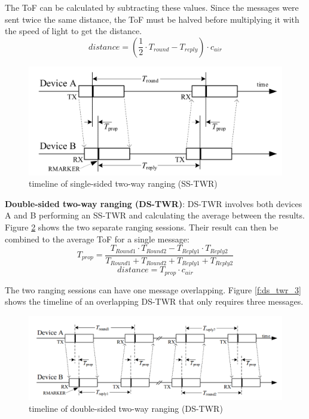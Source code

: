 The ToF can be calculated by subtracting these values.
Since the messages were sent twice the same distance, the ToF must be halved before multiplying it with the speed of light to get the distance.
\begin{equation}
	\mbox{$distance$} =
	\mbox{$(\frac{1}{2}\cdot T_{round}-T_{reply}) \cdot c_{air}$}
\end{equation}

\begin{figure}[ht!]
\centering
\includegraphics[width=\linewidth]{graphics/schematics/SingleSidedTwoWayRanging.png}
\caption{timeline of single-sided two-way ranging (SS-TWR)\cite{IEEE4z}}
\label{f:ss_twr}
\end{figure}

\textbf{Double-sided two-way ranging (DS-TWR)}:
DS-TWR involves both devices A and B performing an SS-TWR and calculating the average between the results.
Figure \ref{f:ds_twr} shows the two separate ranging sessions.
Their result can then be combined to the average ToF for a single message:
\begin{equation}
	\mbox{$T_{prop}$} =
	\mbox{$\frac {T_{Round1}\cdot T_{Round2}-T_{Reply1}\cdot T_{Reply2}}{T_{Round1}+T_{Round2}+T_{Reply1}+T_{Reply2}}$}
\end{equation}
\begin{equation}
	\mbox{$distance$} =
	\mbox{$T_{prop} \cdot c_{air}$}
\end{equation}

The two ranging sessions can have one message overlapping.
Figure \ref{f:ds_twr_3} shows the timeline of an overlapping DS-TWR that only requires three messages.


\begin{figure}[ht!]
\centering
\includegraphics[width=\linewidth]{graphics/schematics/TwoSidedTwoWayRanging.PNG}
\caption{timeline of double-sided two-way ranging (DS-TWR)\cite{IEEE4z}}
\label{f:ds_twr}
\end{figure}


